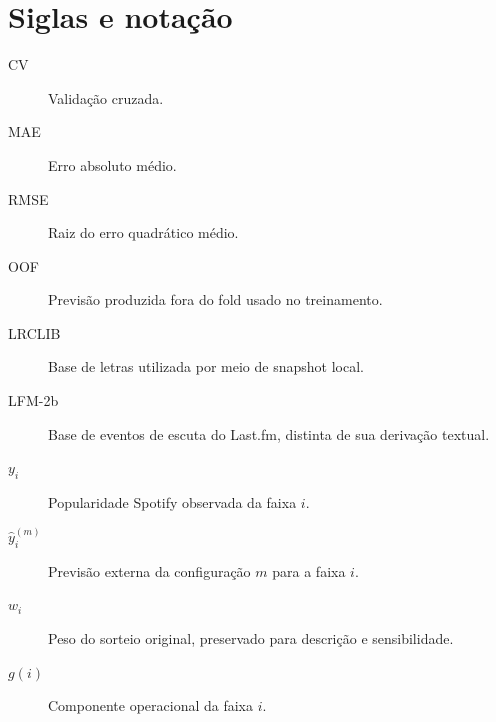 \chapter*{Siglas e notação}
\begin{description}
\item[CV] Validação cruzada.
\item[MAE] Erro absoluto médio.
\item[RMSE] Raiz do erro quadrático médio.
\item[OOF] Previsão produzida fora do fold usado no treinamento.
\item[LRCLIB] Base de letras utilizada por meio de snapshot local.
\item[LFM-2b] Base de eventos de escuta do Last.fm, distinta de sua derivação textual.
\item[$y_i$] Popularidade Spotify observada da faixa $i$.
\item[$\widehat y_i^{(m)}$] Previsão externa da configuração $m$ para a faixa $i$.
\item[$w_i$] Peso do sorteio original, preservado para descrição e sensibilidade.
\item[$g(i)$] Componente operacional da faixa $i$.
\end{description}
